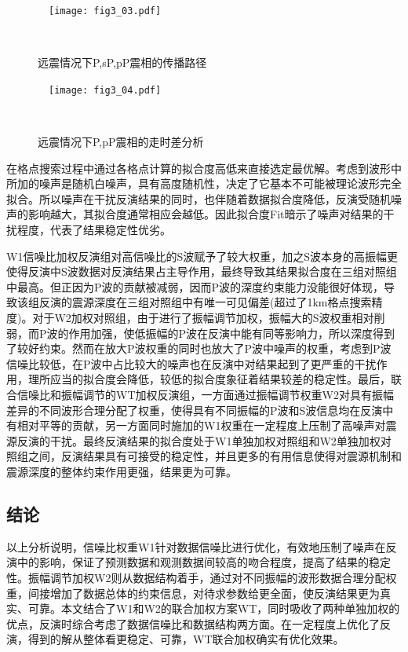\begin{figure}
\centering
  \texttt{[image: fig3\_03.pdf]}
  \caption{远震情况下P,sP,pP震相的传播路径\citep{Stein2003}}
  \label{fig3_03}
\end{figure}
\begin{figure}
\centering
  \texttt{[image: fig3\_04.pdf]}
  \caption{远震情况下P,pP震相的走时差分析\citep{Stein2003}}
  \label{fig3_04}
\end{figure}

在格点搜索过程中通过各格点计算的拟合度高低来直接选定最优解。考虑到波形中所加的噪声是随机白噪声，具有高度随机性，决定了它基本不可能被理论波形完全拟合。所以噪声在干扰反演结果的同时，也伴随着数据拟合度降低，反演受随机噪声的影响越大，其拟合度通常相应会越低。因此拟合度Fit暗示了噪声对结果的干扰程度，代表了结果稳定性优劣。

W1信噪比加权反演组对高信噪比的S波赋予了较大权重，加之S波本身的高振幅更使得反演中S波数据对反演结果占主导作用，最终导致其结果拟合度在三组对照组中最高。但正因为P波的贡献被减弱，因而P波的深度约束能力没能很好体现，导致该组反演的震源深度在三组对照组中有唯一可见偏差(超过了1km格点搜索精度)。对于W2加权对照组，由于进行了振幅调节加权，振幅大的S波权重相对削弱，而P波的作用加强，使低振幅的P波在反演中能有同等影响力，所以深度得到了较好约束。然而在放大P波权重的同时也放大了P波中噪声的权重，考虑到P波信噪比较低，在P波中占比较大的噪声也在反演中对结果起到了更严重的干扰作用，理所应当的拟合度会降低，较低的拟合度象征着结果较差的稳定性。最后，联合信噪比和振幅调节的WT加权反演组，一方面通过振幅调节权重W2对具有振幅差异的不同波形合理分配了权重，使得具有不同振幅的P波和S波信息均在反演中有相对平等的贡献，另一方面同时施加的W1权重在一定程度上压制了高噪声对震源反演的干扰。最终反演结果的拟合度处于W1单独加权对照组和W2单独加权对照组之间，反演结果具有可接受的稳定性，并且更多的有用信息使得对震源机制和震源深度的整体约束作用更强，结果更为可靠。

\subsection{结论}
以上分析说明，信噪比权重W1针对数据信噪比进行优化，有效地压制了噪声在反演中的影响，保证了预测数据和观测数据间较高的吻合程度，提高了结果的稳定性。振幅调节加权W2则从数据结构着手，通过对不同振幅的波形数据合理分配权重，间接增加了数据总体的约束信息，对待求参数给更全面，使反演结果更为真实、可靠。本文结合了W1和W2的联合加权方案WT，同时吸收了两种单独加权的优点，反演时综合考虑了数据信噪比和数据结构两方面。在一定程度上优化了反演，得到的解从整体看更稳定、可靠，WT联合加权确实有优化效果。


